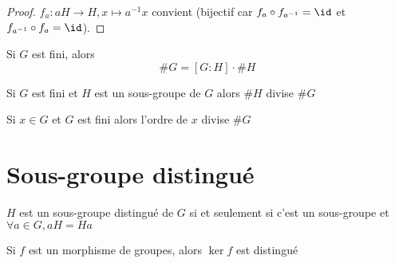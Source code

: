 \begin{proof}
    $f_a:aH\longrightarrow H, x\longmapsto a^{-1}x$ convient (bijectif car $f_a\circ f_{a ^{-1}}=\id$ et $f_{a^{-1}}\circ f_a=\id$).
\end{proof}

\begin{cor}
    Si $G$ est fini, alors  \[\#G=[G:H]\cdot \#H\]
\end{cor}

\begin{thm}[Lagrange]
Si $G$ est fini et  $H$ est un sous-groupe de  $G$ alors  $\#H$ divise $\#G$
\end{thm}

\begin{cor}
Si $x \in  G$ et $G$ est fini alors l'ordre de  $x$ divise $\#G$
\end{cor}

\section{Sous-groupe distingué}

\begin{dfn}
$H$ est un sous-groupe distingué de  $G$  si et seulement si c'est un sous-groupe et $\forall  a \in G, aH=Ha$
\end{dfn}

\begin{prop}
Si $f$ est un morphisme de groupes, alors  $\ker f$ est distingué
\end{prop}
